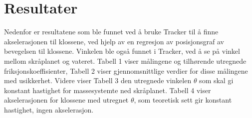 \documentclass[10pt,a4paper]{report}
\begin{document}
\section*{Resultater}
Nedenfor er resultatene som ble funnet ved å bruke Tracker til å finne akselerasjonen til klossene, ved hjelp av en regresjon av posisjonsgraf av bevegelsen til klossene. Vinkelen ble også funnet i Tracker, ved å se på vinkel mellom skråplanet og vateret. Tabell 1 viser målingene og tilhørende utregnede friksjonskoeffisienter, Tabell 2 viser gjennomsnittlige verdier for disse målingene med usikkerhet. Videre viser Tabell 3 den utregnede vinkelen $\theta$ som skal gi konstant hastighet for massesystemte ned skråplanet. Tabell 4 viser akselerasjonen for klossene med utregnet $\theta$, som teoretisk sett gir konstant hastighet, ingen akselerasjon.
\end{document}
